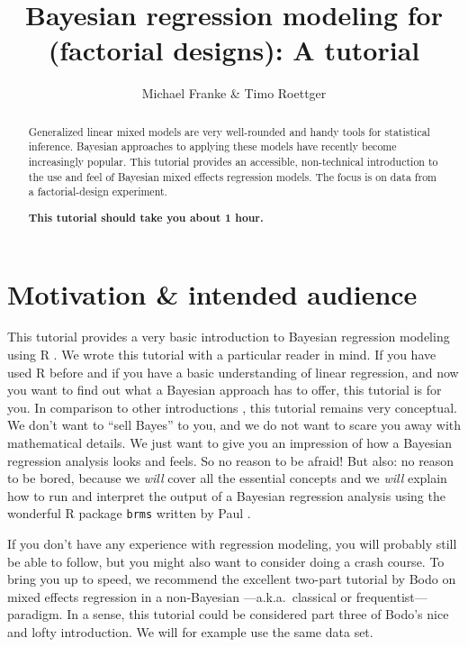 \documentclass[nobib]{tufte-handout}
\title{Bayesian regression modeling for (factorial designs): A tutorial}
\author{Michael Franke \& Timo Roettger}
\date{}
\begin{document}
\maketitle

\begin{abstract}
  \noindent Generalized linear mixed models are very well-rounded and handy tools for statistical inference. Bayesian approaches to applying these models have recently become increasingly popular. This tutorial provides an accessible, non-technical introduction to the use and feel of Bayesian mixed effects regression models. The focus is on data from a factorial-design experiment. \\
  
  \medskip
  
  \noindent \textbf{This tutorial should take you about 1 hour.}
\end{abstract}

\section{Motivation \& intended audience}

This tutorial provides a very basic introduction to Bayesian regression modeling using R \citep{Manual}. We wrote this tutorial with a particular reader in mind. If you have used R before and if you have a basic understanding of linear regression, and now you want to find out what a Bayesian approach has to offer, this tutorial is for you. In comparison to other introductions \citep[e.g.][]{SorensenHohensteinb2016:Bayesian-linear}, this tutorial remains very conceptual. We don’t want to ``sell Bayes'' to you, and we do not want to scare you away with mathematical details. We just want to give you an impression of how a Bayesian regression analysis looks and feels. So no reason to be afraid! But also: no reason to be bored, because we \emph{will} cover all the essential concepts and we \emph{will} explain how to run and interpret the output of a Bayesian regression analysis using the wonderful R package \texttt{brms} written by Paul \citet{buerkner2016brms}.

If you don’t have any experience with regression modeling, you will probably still be able to follow, but you might also want to consider doing a crash course. To bring you up to speed, we recommend the excellent two-part tutorial by Bodo \citet{Winter2013:Linear-models-a} on mixed effects regression in a non-Bayesian ---a.k.a.~classical or frequentist--- paradigm. In a sense, this tutorial could be considered part three of Bodo's nice and lofty introduction. We will for example use the same data set.
\end{document}
